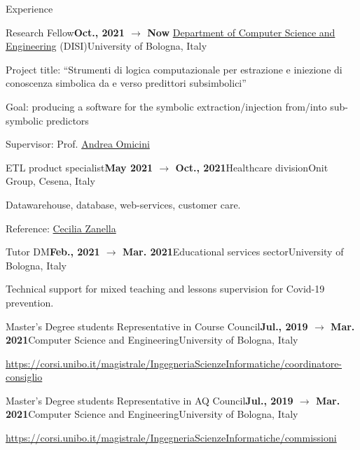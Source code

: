\documentclass{resume} %
\begin{document}
\begin{rSection}{Experience}
        \begin{rSubsection}{Research Fellow}{\textbf{Oct., 2021 $\rightarrow$ Now}}{ \href{https://disi.unibo.it/it}{Department of Computer Science and Engineering} (DISI)}{University of Bologna, Italy}
            \item Project title: ``Strumenti di logica computazionale per estrazione e iniezione di conoscenza simbolica da e verso predittori subsimbolici''
            \item Goal: producing a software for the symbolic extraction/injection from/into sub-symbolic predictors
            \item Supervisor: Prof. \href{mailto:andrea.omicini@unibo.it}{Andrea Omicini}
        \end{rSubsection}
        
        \begin{rSubsection}{ETL product specialist}{\textbf{May 2021 $\rightarrow$ Oct., 2021}}{Healthcare division}{Onit Group, Cesena, Italy}
            \item Datawarehouse, database, web-services, customer care.
            \item Reference: \href{mailto:czanella@onit.it}{Cecilia Zanella}
        \end{rSubsection}
        
        \begin{rSubsection}{Tutor DM}{\textbf{Feb., 2021 $\rightarrow$ Mar. 2021}}{Educational services sector}{University of Bologna, Italy}
            \item Technical support for mixed teaching and lessons supervision for Covid-19 prevention.
        \end{rSubsection}
        
        \begin{rSubsection}{Master's Degree students Representative in Course Council}{\textbf{Jul., 2019 $\rightarrow$ Mar. 2021}}{Computer Science and Engineering}{University of Bologna, Italy}
            \item \url{https://corsi.unibo.it/magistrale/IngegneriaScienzeInformatiche/coordinatore-consiglio}
        \end{rSubsection}
        
        \begin{rSubsection}{Master's Degree students Representative in AQ Council}{\textbf{Jul., 2019 $\rightarrow$ Mar. 2021}}{Computer Science and Engineering}{University of Bologna, Italy}
            \item \url{https://corsi.unibo.it/magistrale/IngegneriaScienzeInformatiche/commissioni}
        \end{rSubsection}
        

\end{rSection}
\end{document}
